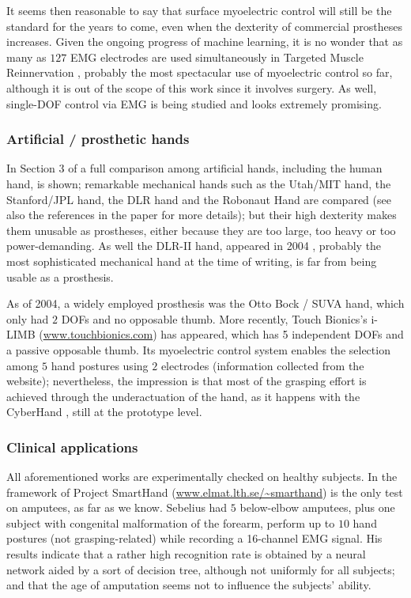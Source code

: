 It seems then reasonable to say that surface myoelectric control will still be the standard for the
years to come, even when the dexterity of commercial prostheses increases. Given the
ongoing progress of machine learning, it is no wonder that as many as $127$ EMG
electrodes are used simultaneously in Targeted
Muscle Reinnervation \cite{kuiken06}, probably the most spectacular use of myoelectric control
so far, although it is out of the scope of this work since it involves surgery.
As well, single-DOF control via EMG is being studied \cite{englehart08} and looks extremely
promising.

\subsubsection{Artificial / prosthetic hands}

In Section $3$ of \cite{zecca02} a full comparison among artificial hands, including
the human hand, is shown; remarkable mechanical hands such as the Utah/MIT hand, the
Stanford/JPL hand, the DLR hand and the Robonaut Hand are compared (see also the
references in the paper for more details); but their high dexterity makes them
unusable as prostheses, either because they are too large, too heavy or too power-demanding.
As well the DLR-II hand, appeared in 2004 \cite{ButFisGre2004}, probably the most sophisticated
mechanical hand at the time of writing, is far from being usable as a prosthesis.

As of 2004, a widely employed prosthesis was the Otto Bock / SUVA hand, which only had $2$ DOFs and
no opposable thumb. More recently, Touch Bionics's i-LIMB (\url{www.touchbionics.com}) has appeared, which has
5 independent DOFs and a passive opposable thumb. Its myoelectric control system enables
the selection among $5$ hand postures using $2$ electrodes (information collected from the
website); nevertheless, the impression is that most of the grasping effort is achieved through
the underactuation of the hand, as it happens with the CyberHand \cite{cyberhand}, still at
the prototype level.

\subsubsection{Clinical applications}

All aforementioned works are experimentally checked on healthy subjects. In the framework of
Project SmartHand (\url{www.elmat.lth.se/~smarthand}) \cite{sebelius} is the only
test on amputees, as far as we know. Sebelius had $5$ below-elbow amputees, plus one subject
with congenital malformation of the forearm, perform up to
$10$ hand postures (not grasping-related) while recording a 16-channel EMG signal. His
results indicate that a rather high recognition rate is obtained by a neural network
aided by a sort of decision tree, although not uniformly for all subjects; and that
the age of amputation seems not to influence the subjects' ability.

